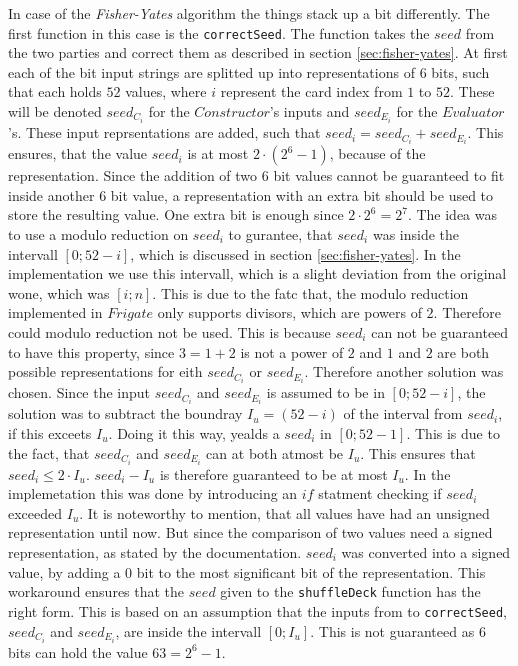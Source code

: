 \documentclass[twoside,11pt,openright]{report}
\newcommand{\FY}{\textit{Fisher-Yates} }
\begin{document}
In case of the \FY algorithm the things stack up a bit differently. The first function in this case is the \verb|correctSeed|. The function takes the $seed$ from the two parties and correct them as described in section \ref{sec:fisher-yates}. At first each of the bit input strings are splitted up into representations of $6$ bits, such that each holds $52$ values, where $i$ represent the card index from $1$ to $52$. These will be denoted $seed_{C_i}$ for the $Constructor$'s inputs and $seed_{E_i}$ for the $Evaluator$'s. These input reprsentations are added, such that $seed_i = seed_{C_i} + seed_{E_i}$. This ensures, that the value $seed_i$ is at most $2\cdot (2^6 - 1)$, because of the representation. Since the addition of two $6$ bit values cannot be guaranteed to fit inside another $6$ bit value, a representation with an extra bit should be used to store the resulting value. One extra bit is enough since $2\cdot2^6=2^7$.
The idea was to use a modulo reduction on $seed_i$ to gurantee, that $seed_i$ was inside the intervall $[0;52-i]$, which is discussed in section \ref{sec:fisher-yates}. In the implementation we use this intervall, which is a slight deviation from the original wone, which was $[i;n]$. This is due to the fatc that, the modulo reduction implemented in $Frigate$ only supports divisors, which are powers of $2$. Therefore could modulo reduction not be used. This is because $seed_i$ can not be guaranteed to have this property, since $3=1 + 2$ is not a power of $2$ and $1$ and $2$ are both possible representations for eith $seed_{C_i}$ or $seed_{E_i}$. Therefore another solution was chosen. Since the input $seed_{C_i}$ and $seed_{E_i}$ is assumed to be in $[0;52-i]$, the solution was to subtract the boundray $I_u=(52-i)$ of the interval from $seed_i$, if this exceets $I_u$. Doing it this way, yealds a $seed_i$ in $[0;52-1]$. This is due to the fact, that $seed_{C_i}$ and $seed_{E_i}$ can at both  atmost be $I_u$. This ensures that $seed_i \leq 2\cdot I_u$. $seed_i - I_u$ is therefore guaranteed to be at most $I_u$.
In the implemetation this was done by introducing an $if$ statment checking if $seed_i$ exceeded $I_u$. It is noteworthy to mention, that all values have had an unsigned representation until now. But since the comparison of two values need a signed representation, as stated by the documentation. $seed_i$ was converted into a signed value, by adding a $0$ bit to the most significant bit of the representation. This workaround ensures that the $seed$ given to the \verb|shuffleDeck| function has the right form. This is based on an assumption that the inputs from to \verb|correctSeed|, $seed_{C_i}$ and $seed_{E_i}$, are inside the intervall $[0;I_u]$. This is not guaranteed as $6$ bits can hold the value $63=2^6-1$.
\end{document}
